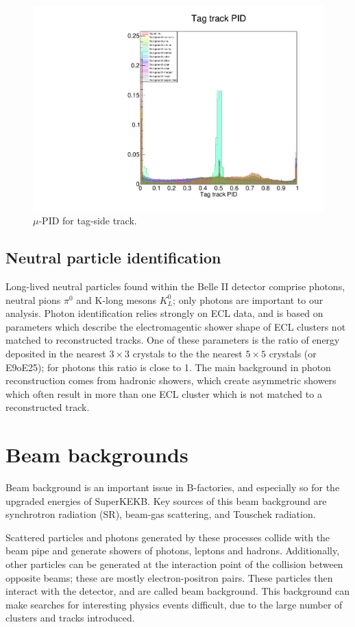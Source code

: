 \documentclass[12pt]{thesis}  %
\begin{document}
\begin{figure}
\centering
\includegraphics[width=0.5\linewidth]{images/tauMG-tagPIDmu.pdf}
\caption[]%
{{\small $\mu$-PID for tag-side track.}}
\label{fig:tagPIDmu}
\end{figure}

\subsection{Neutral particle identification}
\label{sec:neutral PID}

Long-lived neutral particles found within the Belle II detector comprise photons, neutral pions $\pi^0$ and K-long mesons $K^0_L$; only photons are important to our analysis. Photon identification relies strongly on ECL data, and is based on parameters which describe the electromagentic shower shape of ECL clusters not matched to reconstructed tracks. One of these parameters is the ratio of energy deposited in the nearest $3\times 3$ crystals to the the nearest $5 \times 5$ crystals (or E9oE25); for photons this ratio is close to 1. The main background in photon reconstruction comes from hadronic showers, which create asymmetric showers which often result in more than one ECL cluster which is not matched to a reconstructed track.



\section{Beam backgrounds}

Beam background is an important issue in B-factories, and especially so for the upgraded energies of SuperKEKB. Key sources of this beam background are synchrotron radiation (SR), beam-gas scattering, and Touschek radiation\cite{BelleII:tech-design-report}.

Scattered particles and photons generated by these processes collide with the beam pipe and generate showers of photons, leptons and hadrons. Additionally, other particles can be generated at the interaction point of the collision between opposite beams; these are mostly electron-positron pairs. These particles then interact with the detector, and are called beam background. This background can make searches for interesting physics events difficult, due to the large number of clusters and tracks introduced.
\end{document}
